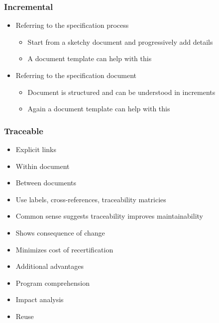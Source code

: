 \documentclass[t,12pt,numbers,fleqn]{beamer}
\newcounter{temp}
\begin{document}

\begin{frame}
\frametitle{Incremental}

\begin{itemize}

\item Referring to the specification process
\begin{itemize}
\item Start from a sketchy document and progressively add details
\item A document template can help with this
\end{itemize}
\item Referring to the specification document
\begin{itemize}
\item Document is structured and can be understood in increments
\item Again a document template can help with this
\end{itemize}

\end{itemize}

\end{frame}


\begin{frame}
\frametitle{Traceable}

\begin{itemize}

\item Explicit links
\bi
\item Within document
\item Between documents
\ei
\item Use labels, cross-references, traceability matricies
\item Common sense suggests traceability improves maintainability
\item Shows consequence of change
\item Minimizes cost of recertification
\item Additional advantages
\bi
\item Program comprehension
\item Impact analysis
\item Reuse
\ei
\end{itemize}

\end{frame}
\end{document}
